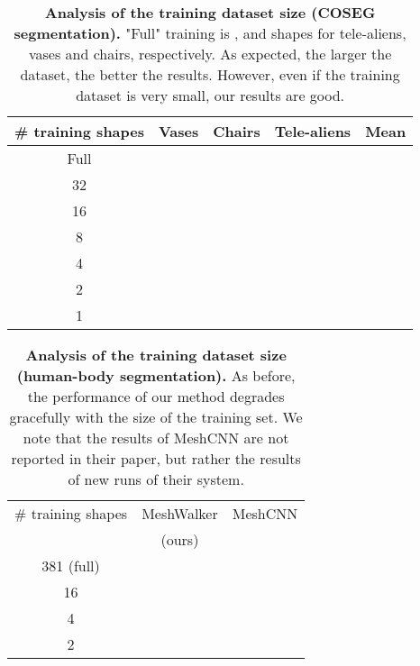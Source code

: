 \documentclass[acmtog]{acmart}
\begin{document}
\begin{table}[htb]\caption{{\bf Analysis of the training dataset size (COSEG segmentation).} 
"Full" training is ,  and  shapes for tele-aliens, vases and chairs, respectively.
As expected, the larger the dataset, the better the results.
However, even if the training dataset is very small, our results are good.
}
\begin{center}
 \begin{tabular}{||c c c c c||} 
 \hline
 \# training shapes & Vases & Chairs & Tele-aliens & Mean \\ [0.5ex] 
 \hline\hline\hline
 Full &  &  &  &  \\ 
 \hline\hline
 32         &  &  &  &  \\
 \hline
 16         &  &  &  &  \\
 \hline
 8          &  &  &  &  \\
 \hline
 4          &  &  &  &  \\
 \hline
 2          &  &  &  &  \\
 \hline
 1          &  &  &  &  \\
 \hline
\end{tabular}
\label{tbl:train_size_alien_coseg}
\end{center}
\end{table}

\begin{table}[htb]\caption{{\bf Analysis of the training dataset size (human-body segmentation).}
As before, the performance of our method degrades gracefully with the size of the training set.
We note that the results of MeshCNN are not reported in their paper, but rather the results of  new runs of their system.
}
\begin{center}
 \begin{tabular}{||c c c||} 
 \hline
 \# training shapes & MeshWalker & MeshCNN \\ [0.5ex] 
   & (ours) & \cite{hanocka2019meshcnn} \\
\hline\hline\hline
 381 (full) &  &  \\ 
 \hline\hline
 16 &  &  \\
 \hline
 4 &  &  \\
 \hline
 2 &  &  \\
 \hline
\end{tabular}
\label{tbl:train_size_human_body}
\end{center}
\end{table}
\end{document}
